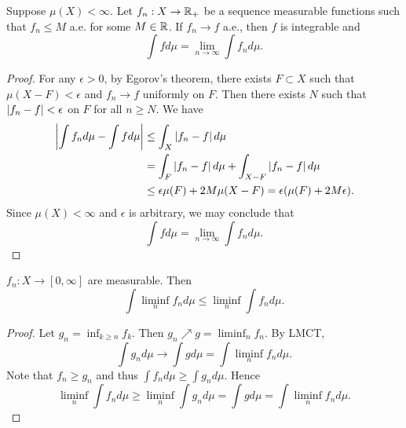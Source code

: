 \begin{theorem}
    Suppose $\mu(X)<\infty$. Let $f_n:X\to\mathbb{R}_+$ be a sequence 
    measurable functions such that $f_n\leq M$ a.e. for some 
    $M\in\mathbb{R}$. If $f_n\to f$ a.e., then $f$ is integrable and 
    \begin{equation*}
        \int fd\mu = \lim_{n\to\infty}\int f_nd\mu.
    \end{equation*}
\end{theorem}
\begin{proof}
    For any $\epsilon>0$, by Egorov's theorem, there exists 
    $F\subset X$ such that $\mu(X-F)<\epsilon$ and $f_n\to f$ 
    uniformly on $F$. Then there exists $N$ such that 
    $\left\lvert {f_n-f} \right\rvert<\epsilon$ on $F$ for all $n\geq N$. We have 
    \begin{equation*}
        \begin{split}
            \left\lvert {\int f_nd\mu - \int fd\mu} \right\rvert &\leq \int_X \left\lvert {f_n-f} \right\rvert d\mu \\
            &= \int_{F} \left\lvert {f_n-f} \right\rvert d\mu + \int_{X-F}\left\lvert {f_n-f} \right\rvert d\mu \\
            &\leq \epsilon\mu(F)+2M\mu(X-F) = \epsilon(\mu(F)+2M\epsilon).
        \end{split}
    \end{equation*}
    Since $\mu(X)<\infty$ and $\epsilon$ is arbitrary, 
    we may conclude that 
    \begin{equation*}
        \int fd\mu = \lim_{n\to\infty}\int f_nd\mu.
    \end{equation*}
\end{proof}

\begin{lemma}[Fatou]
    $f_n:X\to[0,\infty]$ are measurable. Then
    \begin{equation*}
        \int \liminf_n f_nd\mu \leq \liminf_n \int f_nd\mu.
    \end{equation*}
\end{lemma}
\begin{proof}
    Let $g_n = \inf_{k\geq n} f_k$. Then $g_n\nearrow g = 
    \liminf_n f_n$. By LMCT, 
    \begin{equation*}
        \int g_nd\mu\to \int gd\mu = \int \liminf_n f_nd\mu.
    \end{equation*}
    Note that $f_n\geq g_n$ and thus $\int f_nd\mu\geq\int g_nd\mu$. 
    Hence 
    \begin{equation*}
        \liminf_n \int f_nd\mu \geq\liminf_n\int g_nd\mu 
        = \int gd\mu = \int \liminf_n f_nd\mu.
    \end{equation*}
\end{proof}


